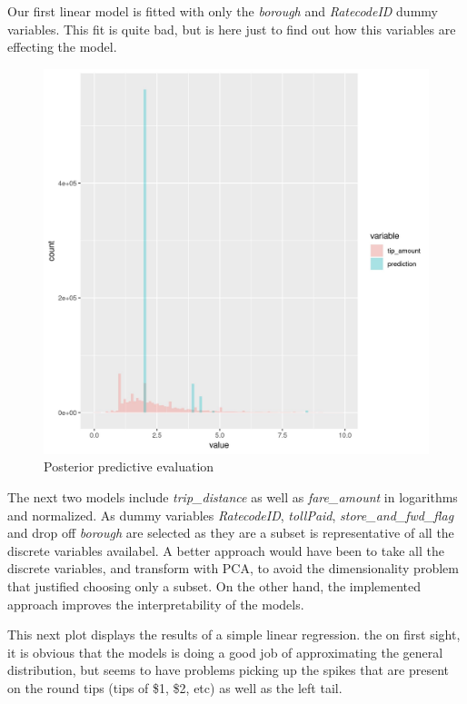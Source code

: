 \documentclass[11pt]{article}
\begin{document}
Our first linear model is fitted with only the \emph{borough} and \emph{RatecodeID}
dummy variables. This fit is quite bad, but is here just to find out how
this variables are effecting the model.

\begin{figure}[htbp]
\centering
\includegraphics[width=.9\linewidth]{./plots/evaluation0PosteriorPredictive.jpg}
\caption{\label{fig:orgbf15125}
Posterior predictive evaluation}
\end{figure}

The next two models include \emph{trip\_distance} as well as \emph{fare\_amount} in
logarithms and normalized. As dummy variables \emph{RatecodeID}, \emph{tollPaid},
\emph{store\_and\_fwd\_flag} and drop off \emph{borough} are selected as they are a
subset is representative of all the discrete variables availabel. A better
approach would have been to take all the discrete variables, and transform
with PCA, to avoid the dimensionality problem that justified choosing only
a subset. On the other hand, the implemented approach improves the
interpretability of the models.

This next plot displays the results of a simple linear regression.
the on first sight, it is obvious that the models is doing a good job
of approximating the general distribution, but seems to have problems
picking up the spikes that are present on the round tips (tips of \$1, \$2, etc)
as well as the left tail.
\end{document}
